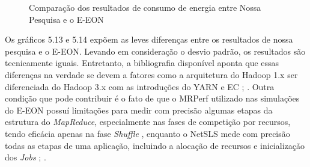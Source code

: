 \begin{figure}[!htb]
    \centering
    \label{fig:ComparaEEONEnergia}
    
    \hfill
    
    \caption{\centering Comparação dos resultados de consumo de energia entre Nossa Pesquisa e o E-EON}
\end{figure}

Os gráficos 5.13 e 5.14 expõem as leves diferenças entre os resultados de nossa pesquisa e o E-EON. Levando em consideração o desvio padrão, os resultados são tecnicamente iguais. Entretanto, a bibliografia disponível aponta que essas diferenças na verdade se devem a fatores como a arquitetura do Hadoop 1.x ser diferenciada do Hadoop 3.x com as introduções do YARN e EC \cite{white2009hadoop}; \cite{white2015hadoop}. Outra condição que pode contribuir é o fato de que o MRPerf \cite{wang2009using} utilizado nas simulações do E-EON possuí limitações para medir com precisão algumas etapas da estrutura do \emph{MapReduce}, especialmente nas fases de competição por recursos, tendo eficácia apenas na fase \emph{Shuffle} \cite{liu2013hsim}, enquanto o NetSLS \cite{wette2015extending} mede com precisão todas as etapas de uma aplicação, incluindo a alocação de recursos e inicialização dos \emph{Jobs} \cite{ApacheSLS}; \cite{wette2015extending}.

